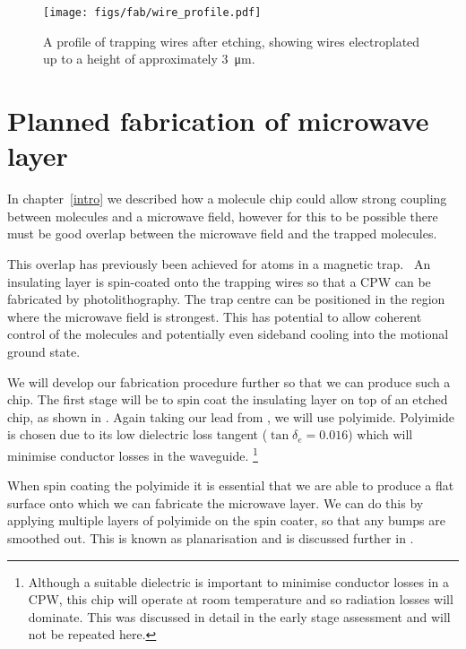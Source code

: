 \begin{figure}
\centering
  \texttt{[image: figs/fab/wire\_profile.pdf]}
  \caption{A profile of trapping wires after etching, showing wires
  electroplated up to a height of approximately \SI{3}{\micro\meter}.
  }
  \label{fab:fig:endprofile}
\end{figure}

\section{Planned fabrication of microwave layer}
\label{fab:planned}

In chapter~\ref{intro} 
we described how a molecule chip could allow strong coupling between \CaF{}
molecules and a microwave field, however for this to be possible there must be
good overlap between the microwave field and the trapped
molecules.~\cite{Andre2006}
%

This overlap has previously been achieved for atoms in a magnetic
trap.~\cite{Treutlein2008} An insulating layer is spin-coated onto the trapping
wires so that a CPW can be fabricated by
photolithography. The trap centre can be positioned in the region where the
microwave field is strongest. This has potential to allow coherent control of
the molecules and potentially even sideband cooling into the motional ground
state.~\cite{Andre2006}
%

We will develop our fabrication procedure further so that we can produce such a
chip. The first stage will be to spin coat the insulating layer on top of an
etched chip, as shown in . Again taking our lead
from , we will use polyimide. Polyimide is chosen due
to its low dielectric loss tangent ($\tan\delta_e = 0.016$) which will minimise
conductor losses in the waveguide.  \footnote{Although a suitable dielectric is
important to minimise conductor losses in a CPW, this chip will operate at room
temperature and so radiation losses will dominate. This was discussed in detail
in the early stage assessment and will not be repeated here.}~\cite{Collin2007,
Simons2004}
%

When spin coating the polyimide it is essential that we are able to produce a
flat surface onto which we can fabricate the microwave layer. We can do this by
applying multiple layers of polyimide on the spin coater, so that any bumps are
smoothed out. This is known as planarisation and is discussed further in
.

